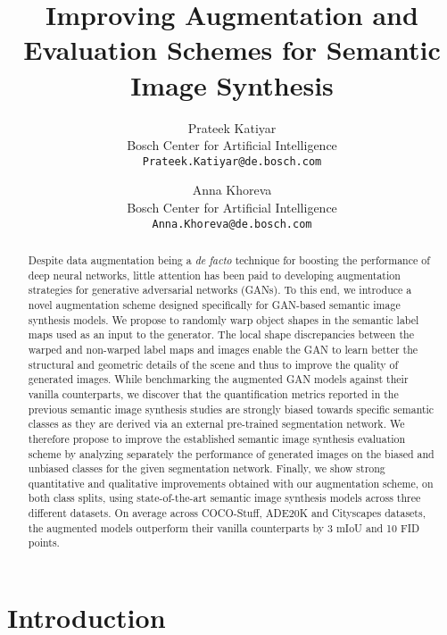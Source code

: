 \documentclass[final]{cvpr}
\newcommand\+{\mkern4mu}
\begin{document}
	

\title{Improving Augmentation and Evaluation Schemes for Semantic Image Synthesis
	}
	
	\author{Prateek Katiyar\\
		Bosch Center for Artificial Intelligence\\
		{\tt\small Prateek.Katiyar@de.bosch.com}
\and
		Anna Khoreva\\
		Bosch Center for Artificial Intelligence\\
		{\tt\small Anna.Khoreva@de.bosch.com}
	}
	
	\maketitle
	
	
\begin{abstract}
	

Despite data augmentation being a \textit{de facto} technique for boosting the performance of deep neural networks, little attention has been paid to developing augmentation strategies for generative adversarial networks (GANs). To this end, we introduce a novel augmentation scheme designed specifically for GAN-based semantic image synthesis models. We propose to randomly warp object shapes in the semantic label maps used as an input to the generator. The local shape discrepancies between the warped and non-warped label maps and images enable the GAN to learn better the structural and geometric details of the scene and thus to improve the quality of generated images.
While benchmarking the augmented GAN models against their vanilla counterparts, we discover that the quantification metrics reported in the previous semantic image synthesis studies are strongly biased towards specific semantic classes as they are derived via an external pre-trained segmentation network. We therefore propose to improve the established semantic image synthesis evaluation scheme by analyzing separately the performance of generated images on the biased and unbiased classes for the given segmentation network. Finally, we show strong quantitative and qualitative improvements obtained with our augmentation scheme, on both class splits, using state-of-the-art semantic image synthesis models across three different datasets. On average across COCO-Stuff, ADE20K and Cityscapes datasets, the augmented models outperform their vanilla counterparts by 3 mIoU and 10 FID points.
\end{abstract} 	
	\section{Introduction}
\label{sec:introduction}
\end{document}
